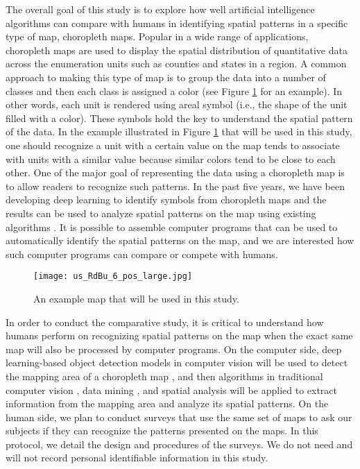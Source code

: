 The overall goal of this study is to explore how well artificial intelligence algorithms can compare with humans in identifying spatial patterns in a specific type of map, choropleth maps. Popular in a wide range of applications, choropleth maps are used to display the spatial distribution of quantitative data across the enumeration units such as counties and states in a region. A common approach to making this type of map is to group the data into a number of classes and then each class is assigned a color (see Figure \ref{fig:MLP} for an example). In other words, each unit is rendered using areal symbol (i.e., the shape of the unit filled with a color). These symbols hold the key to understand the spatial pattern of the data. In the example illustrated in Figure \ref{fig:MLP} that will be used in this study, one should recognize a unit with a certain value on the map tends to associate with units with a similar value because similar colors tend to be close to each other. One of the major goal of representing the data using a choropleth map is to allow readers to recognize such patterns. In the past five years, we have been developing deep learning to identify symbols from choropleth maps and the results can be used to analyze spatial patterns on the map using existing algorithms \citep{li2019geocomp,Li2021}. It is possible to assemble computer programs that can be used to automatically identify the spatial patterns on the map, and we are interested how such computer programs can compare or compete with humans.

\begin{figure}[!ht]
    \centering
    \texttt{[image: us\_RdBu\_6\_pos\_large.jpg]}
    \caption{An example map that will be used in this study.}
    \label{fig:MLP}
  \end{figure}

In order to conduct the comparative study, it is critical to understand how humans perform on recognizing spatial patterns on the map when the exact same map will also be processed by computer programs. On the computer side, deep learning-based object detection models in computer vision will be used to detect the mapping area of a choropleth map \citep{LeCun2015}, and then algorithms in traditional computer vision \citep{Szeliski2021}, data mining \citep{HKT01}, and spatial analysis \citep{xiao2016gisalgs} will be applied to extract information from the mapping area and analyze its spatial patterns. On the human side, we plan to conduct surveys that use the same set of maps to ask our subjects if they can recognize the patterns presented on the maps. In this protocol, we detail the design and procedures of the surveys. We do not need and will not record personal identifiable information in this study.

